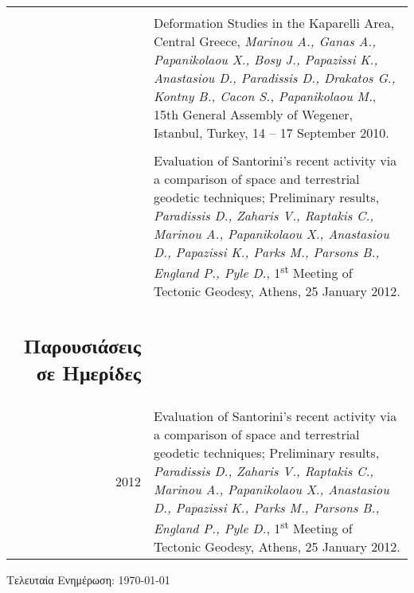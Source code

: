 \documentclass[a4paper,10pt]{article} %
\begin{document}
\begin{longtable}{r|p{14cm}}
  &\\

  & Deformation Studies in the Kaparelli Area, Central Greece,
  \emph{Marinou A., Ganas A., Papanikolaou X., Bosy J., Papazissi K., Anastasiou D., Paradissis D., Drakatos G., Kontny B., Cacon S., Papanikolaou M.},
  15th General Assembly of Wegener, Istanbul, Turkey, 14 – 17 September 2010.\\

  &\\

  & Evaluation of Santorini's recent activity via a comparison of space and terrestrial geodetic techniques; Preliminary results,
  \emph{Paradissis D., Zaharis V., Raptakis C., Marinou A., Papanikolaou X., Anastasiou D., Papazissi K., Parks M., Parsons B., England P., Pyle D.},
  1\textsuperscript{st} Meeting of Tectonic Geodesy, Athens, 25 January 2012.\\

\subsection*{Παρουσιάσεις σε Ημερίδες}

\begin{longtable}{r|p{14cm}}
\multicolumn{2}{c}{} \\
  \textsc{2012}
  & Evaluation of Santorini's recent activity via a comparison of space and terrestrial geodetic techniques; Preliminary results,
  \emph{Paradissis D., Zaharis V., Raptakis C., Marinou A., Papanikolaou X., Anastasiou D., Papazissi K., Parks M., Parsons B., England P., Pyle D.},
  1\textsuperscript{st} Meeting of Tectonic Geodesy, Athens, 25 January 2012.\\
\end{longtable}
\medskip

\vfill
\begin{center}
  \begin{footnotesize}
    Τελευταία Ενημέρωση: \today
  \end{footnotesize}
\end{center}
\end{document}
